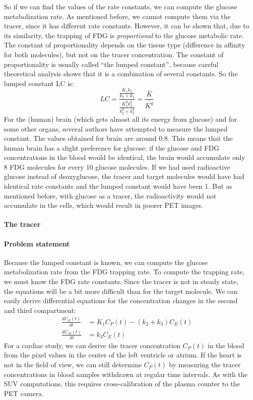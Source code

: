 \documentclass[11pt,oneside]{article}
\begin{document}
So if we can find the values of the rate constants, we can compute the glucose
metabolization rate. As mentioned before, we cannot compute them via the
tracer, since it has different rate constants. However, it can be shown that,
due to its similarity, the trapping of FDG is {\em proportional} to the glucose
metabolic rate. The constant of proportionality depends on the tissue type
(difference in affinity for both molecules), but not on the tracer
concentration. The constant of proportionality is usually called ``the lumped
constant'', because careful theoretical analysis shows that it is a combination
of several constants. So the lumped constant LC is:
\begin{equation}
  LC = \frac{\frac{K_1 k_3}{k_2 + k_3}}{\frac{K_1^g k_3^g}{k_2^g + k_3^g}}
  = \frac{\bar{K}}{\bar{K^g}}
\end{equation}
For the (human) brain (which gets almost all its energy from glucose)
and for some other organs, several authors have attempted to measure
the lumped constant. The values obtained for brain are around
0.8. This means that the human brain has a slight preference for
glucose: if the glucose and FDG concentrations in the blood would be
identical, the brain would accumulate only 8 FDG molecules for every
10 glucose molecules. If we had used radioactive glucose instead of
deoxyglucose, the tracer and target molecules would have had identical
rate constants and the lumped constant would have been 1. But as
mentioned before, with glucose as a tracer, the radioactivity would
not accumulate in the cells, which would result in poorer PET images.

\paragraph{The tracer}
\paragraph{Problem statement\\}
Because the lumped constant is known, we can compute the glucose
metabolization rate from the FDG trapping rate. To compute the trapping rate,
we must know the FDG rate constants. Since the tracer is not in steady state,
the equations will be a bit more difficult than for the target molecule.  We
can easily derive differential equations for the concentration changes in the
second and third compartment:
\begin{align}
  \frac{dC_E(t)}{dt} &= K_1 C_P(t) - (k_2 + k_3) C_E(t) \label{eq:C_E}\\
  \frac{dC_M(t)}{dt} &= k_3 C_E(t) \label{eq:C_M}
\end{align}
For a cardiac study, we can derive the tracer concentration $C_P(t)$ in the
blood from the pixel values in the center of the left ventricle or atrium. If
the heart is not in the field of view, we can still determine $C_P(t)$ by
measuring the tracer concentrations in blood samples withdrawn at regular time
intervals.  As with the SUV computations, this requires cross-calibration of
the plasma counter to the PET camera.
\end{document}
